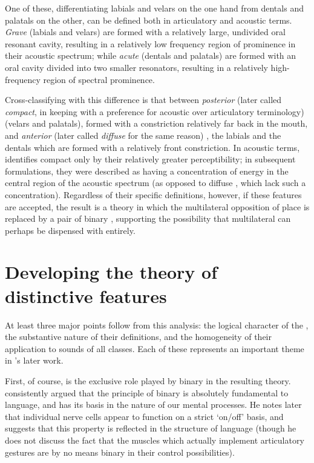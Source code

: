 One of these, differentiating labials and velars on the one hand from
dentals and palatals on the other, can be defined both in articulatory
and acoustic terms. \emph{Grave}  (labials and velars) are
formed with a relatively large, undivided oral resonant cavity,
resulting in a relatively low frequency region of prominence in their
acoustic spectrum; while \emph{acute}  (dentals and
palatals) are formed with an oral cavity divided into two smaller
resonators, resulting in a relatively high-frequency region of
spectral prominence.

Cross-classifying with this difference is that between
\emph{posterior} (later called \emph{compact}, in keeping with a
preference for acoustic over articulatory terminology) 
(velars and palatals), formed with a constriction relatively far back
in the mouth, and \emph{anterior} (later called \emph{diffuse} for the
same reason) , the labials and the dentals which are formed
with a relatively front constriction. In acoustic terms,
\citet{jakobson39:classement} identifies compact  only by
their relatively greater perceptibility; in subsequent formulations,
they were described as having a concentration of energy in the central
region of the acoustic spectrum (as opposed to diffuse ,
which lack such a concentration). Regardless of their specific
definitions, however, if these features are accepted, the result is a
theory in which the multilateral opposition of place is replaced by a
pair of binary , supporting the possibility that
multilateral  can perhaps be dispensed with entirely.

\section{Developing the theory of distinctive features}

At least three major points follow from this analysis: the logical
character of the , the substantive nature of their
definitions, and the homogeneity of their application to sounds of all
classes. Each of these represents an important theme in {\Jakobson}'s
later work.

First, of course, is the exclusive role played by binary 
in the resulting theory. {\Jakobson} consistently argued that the
principle of binary  is absolutely fundamental to language,
and has its basis in the nature of our mental processes. He notes
later that individual nerve cells appear to function on a strict
`on/off' basis, and suggests that this property is reflected in the
structure of language (though he does not discuss the fact that the
muscles which actually implement articulatory gestures are by no means
binary in their control possibilities).

